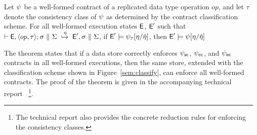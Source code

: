 \begin{theorem}
\label{thm:classification-sound}
Let $\psi$ be a well-formed contract of a replicated data type operation
$\mathit{op}$, and let $\tau$ denote the consistency class of $\psi$ as
determined by the contract classification scheme. For all well-formed execution
states ${\normalfont \textsf{E}}$, ${\normalfont \textsf{E}}'$ such that
$\vdash {\normalfont \textsf{E}},\langle op,\tau \rangle;\sigma ~\|~ \Sigma \;\xhookrightarrow{\eta}\; {\normalfont \textsf{E}}', \sigma
~\|~ \Sigma$, if ${\normalfont \textsf{E}}' \models \psi_\tau[\eta/\hat{\eta}]$, then ${\normalfont \textsf{E}}' \models
\psi[\eta/\hat{\eta}]$
\end{theorem}

The theorem states that if a data store correctly enforces $\psi_{\sf sc}$, $\psi_{\sf cc}$, and
$\psi_{\sf ec}$ contracts in all well-formed executions, then the same store, extended
with the classification scheme shown in Figure~\ref{sem:classify}, can enforce
all well-formed \name contracts. The proof of the theorem is given in the
accompanying technical report~\cite{techrep} \footnote{The technical report also
provides the concrete reduction rules for enforcing the consistency classes.}.
